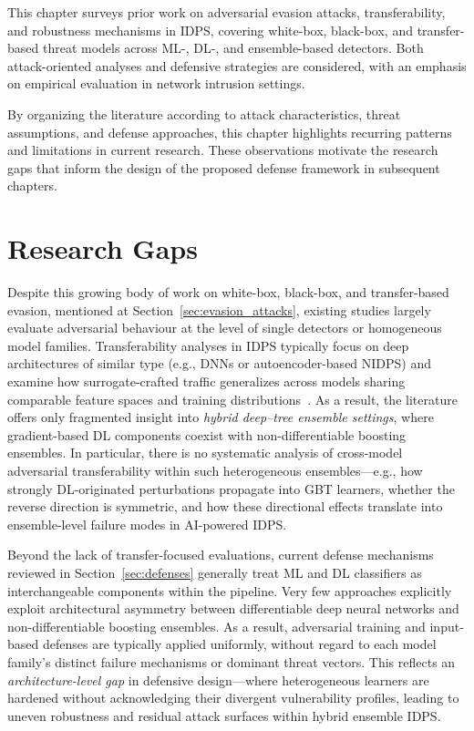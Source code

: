 \documentclass[12pt, a4paper, reqno, oneside]{book}
\begin{document}
This chapter surveys prior work on adversarial evasion attacks, transferability, and robustness mechanisms in IDPS, covering white-box, black-box, and transfer-based threat models across ML-, DL-, and ensemble-based detectors. Both attack-oriented analyses and defensive strategies are considered, with an emphasis on empirical evaluation in network intrusion settings.

By organizing the literature according to attack characteristics, threat assumptions, and defense approaches, this chapter highlights recurring patterns and limitations in current research. These observations motivate the research gaps that inform the design of the proposed defense framework in subsequent chapters.



\section{Research Gaps}
Despite this growing body of work on white-box, black-box, and transfer-based evasion, mentioned at Section~\ref{sec:evasion_attacks}, existing studies largely evaluate adversarial behaviour at the level of single detectors or homogeneous model families. Transferability analyses in IDPS typically focus on deep architectures of similar type (e.g., DNNs or autoencoder-based NIDPS) and examine how surrogate-crafted traffic generalizes across models sharing comparable feature spaces and training distributions~\cite{jMLtransferatk-papernot16,jTransferAdvAtk-DLNIDS-Mao25,jTransAdv-in-AENIDS-Zhang24,jCoseBlackboxtransfer-in-cybersec-Roshan24}. As a result, the literature offers only fragmented insight into \textit{hybrid deep--tree ensemble settings}, where gradient-based DL components coexist with non-differentiable boosting ensembles. In particular, there is no systematic analysis of cross-model adversarial transferability within such heterogeneous ensembles---e.g., how strongly DL-originated perturbations propagate into GBT learners, whether the reverse direction is symmetric, and how these directional effects translate into ensemble-level failure modes in AI-powered IDPS.

Beyond the lack of transfer-focused evaluations, current defense mechanisms reviewed in Section~\ref{sec:defenses} generally treat ML and DL classifiers as interchangeable components within the pipeline. Very few approaches explicitly exploit architectural asymmetry between differentiable deep neural networks and non-differentiable boosting ensembles. As a result, adversarial training and input-based defenses are typically applied uniformly, without regard to each model family's distinct failure mechanisms or dominant threat vectors. This reflects an \textit{architecture-level gap} in defensive design---where heterogeneous learners are hardened without acknowledging their divergent vulnerability profiles, leading to uneven robustness and residual attack surfaces within hybrid ensemble IDPS.
\end{document}
